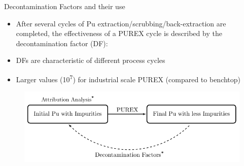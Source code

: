\documentclass{beamer}
\newcommand{\tss}{\textsuperscript}
\begin{document}





\begin{frame}{Decontamination Factors and their use}
  \begin{itemize}
  \item{After several cycles of Pu extraction/scrubbing/back-extraction
    are completed, the effectiveness of a PUREX cycle is described
    by the decontamination factor (DF):}
  \item{DFs are characteristic of different process cycles}
  \item{Larger values (10\tss{7}) for industrial scale PUREX (compared
  to benchtop)\tss{\cite{stoller1961reactor,benedict1982nuclear}}}
  \end{itemize}
  \begin{figure}[H]
    \vspace{-3mm}
      \begin{center}
        \includegraphics[scale = 0.7]{figures/purpose}
      \end{center}
    \end{figure}
\end{frame}
\end{document}
